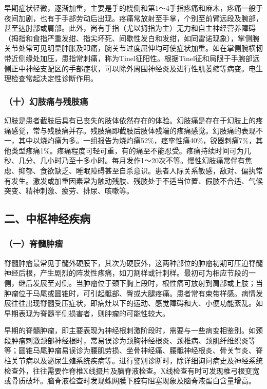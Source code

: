 早期症状轻微，逐渐加重，主要是手的桡侧和第1～4手指疼痛和麻木，疼痛一般于夜间加剧，也有于手部劳动后出现。疼痛常放射至手掌，个别至前臂远段及腕部，甚至达肘部或肩部。此外，尚有手指（尤以拇指为主）无力和自主神经营养障碍（拇指和食指严重发绀、指尖坏死、间歇性发白和发绀，如同雷诺现象），掌侧腕关节处常可见明显肿胀及叩痛，腕关节过度屈伸均可使症状加重。如在掌侧腕横韧带近侧缘处加压，患指常刺痛，称为Tinel征阳性。根据Tinel征和局限于手腕部远侧正中神经支配区的手部症状，可以除外周围神经炎及进行性肌萎缩等病变。电生理检查常起决定性诊断作用。

\subsubsection{（十）幻肢痛与残肢痛}

幻肢是患者截肢后具有已丧失的肢体依然存在的体验。幻肢痛是存在于幻肢上的疼痛感觉，常与残肢痛并存。残肢痛即截肢后肢体残端的疼痛感觉。幻肢痛的表现不一，其中以烧灼痛为多。一组报告为烧灼痛52\%，痉挛性痛40\%，锐器刺痛7\%，其他类型疼痛1\%。疼痛程度可轻可重，有的痛至不能忍受。疼痛持续时间可为几秒、几分、几小时乃至十多小时。每月发作1～20次不等。慢性幻肢痛常伴有焦虑、抑郁、食欲缺乏、睡眠障碍甚至自杀意识。患者人际关系敏感，敌对、偏执常有发生。激发或加重因素常为触动残肢、残肢处于不适当位置、假肢不合适、气候突变、精神刺激、疲劳、排尿、咳嗽等。

\protect\hypertarget{text00340.html}{}{}

\subsection{二、中枢神经疾病}

\subsubsection{（一）脊髓肿瘤}

脊髓肿瘤最常见于髓外硬膜下，其次为硬膜外，这两种部位的肿瘤初期可压迫脊髓神经后根，产生剧烈的阵发性疼痛，如刀割样或针刺样。最初可为相应节段的一侧，继后发展至对侧。当肿瘤位于颈下胸上段时，根性痛可放射到肩部或上肢；当肿瘤位于马尾或圆锥时，可引起骶部、臀或大腿疼痛。患者常有束带样感。病情发展往往出现脊髓受压症状，即病灶以下的运动、感觉障碍和大、小便功能紊乱。如早期表现为脊髓半侧损害者，则肿瘤的可能性较大。

早期的脊髓肿瘤，即主要表现为神经根刺激阶段时，需要与一些病变相鉴别。如颈段肿瘤刺激颈部神经根时，常易误诊为颈胸神经根炎、颈椎病、颈肌纤维织炎等等；圆锥马尾肿瘤易误诊为腰肌劳损、坐骨神经痛、腰骶神经根炎、骨关节炎、脊柱关节病以及泌尿生殖系统疾病等。进行鉴别诊断时，除详细询问病史及神经系统检查外，往往需要作脊椎X线摄片及脑脊液检查。X线检查有时可发现椎弓根变宽或骨质破坏。脑脊液检查时发现蛛网膜下腔有阻塞现象及脑脊液蛋白含量增高。

